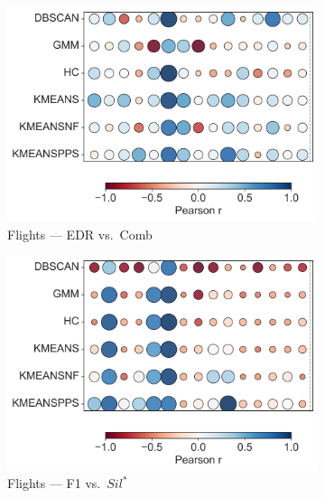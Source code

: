 \documentclass[10pt]{article} %
\numberwithin{equation}{section}
\begin{document}
\begin{figure}[htbp]
  \begin{subfigure}[b]{0.33\linewidth}
    \includegraphics[width=\linewidth]{figures/6.4.3graph/FL_EDR_vs_Combined Score.pdf}
    \caption{Flights — EDR vs.\ Comb}
    \label{fig:fl_edr_comb}
  \end{subfigure}\hfill
  \begin{subfigure}[b]{0.33\linewidth}
    \includegraphics[width=\linewidth]{figures/6.4.3graph/FL_F1_vs_Silhouette Score.pdf}
    \caption{Flights — F1 vs.\ $Sil^\ast$}
    \label{fig:fl_f1_sil}
  \end{subfigure}\hfill
  \begin{subfigure}[b]{0.33\linewidth}

\end{subfigure}
\end{figure}
\end{document}
